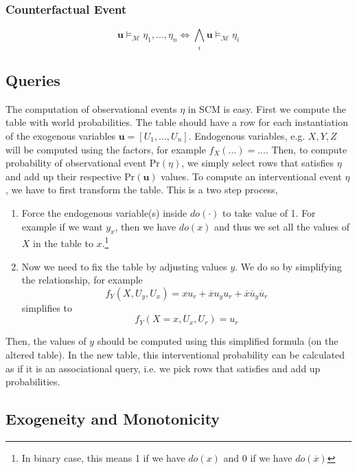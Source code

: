 \documentclass[11pt]{article}
\newcommand{\bu}{\mathbf{u}}
\newcommand{\pr}{\mathrm{Pr}}
\begin{document}
\subsubsection{Counterfactual Event}
\begin{equation}
	\bu \vDash_{\mathcal M} \eta_1, ..., \eta_n \iff \bigwedge_i \bu \vDash_{\mathcal M} \eta_i
\end{equation}

\subsection{Queries}
The computation of observational events $\eta$ in SCM is easy. First we compute the table with world probabilities. The table should have a row for each instantiation of the exogenous variables $\bu = [U_1, ..., U_n]$. Endogenous variables, e.g. $X, Y, Z$ will be computed using the factors, for example $f_X(...) = ...$. Then, to compute probability of observational event $\pr(\eta)$, we simply select rows that satisfies $\eta$ and add up their respective $\pr(\bu)$ values. To compute an interventional event $\eta$, we have to first transform the table. This is a two step process, 
\begin{enumerate}
	\item Force the endogenous variable(s) inside $do(\cdot)$ to take value of 1. For example if we want $y_x$, then we have $do(x)$ and thus we set all the values of $X$ in the table to $x$.\footnote{In binary case, this means 1 if we have $do(x)$ and 0 if we have $do(\overbar x)$} 
	\item Now we need to fix the table by adjusting values $y$. We do so by simplifying the relationship, for example
	\begin{equation}
		f_Y(X, U_y, U_x) = xu_r + \overbar x u_y u_r + \overbar x \overbar u _y \overbar u_r
	\end{equation}
	simplifies to 
	\begin{equation}
		f_Y(X = x, U_x, U_r) = u_r
	\end{equation}
\end{enumerate}
Then, the values of $y$ should be computed using this simplified formula (on the altered table). In the new table, this interventional probability can be calculated as if it is an associational query, i.e. we pick rows that satisfies and add up probabilities. 

\subsection{Exogeneity and Monotonicity}
\end{document}
